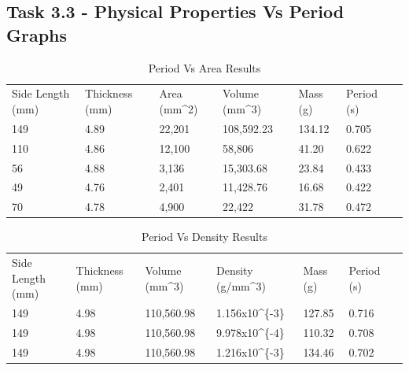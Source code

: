 \documentclass[12pt]{article}
\begin{document}

\pagebreak
\subsection{Task 3.3 - Physical Properties Vs Period Graphs}
\label{Task 3.3 - Physical Properties Vs Period Graphs}

\begin{table}[H]
\centering
\caption{Period Vs Area Results}
\label{Period Vs Area Results}
\begin{tabular}{lllllll}
Side Length (mm) & Thickness (mm) & Area (mm\textasciicircum 2) & Volume (mm\textasciicircum 3) & Mass (g) & Period (s) \\
149              & 4.89           & 22,201                      & 108,592.23                    & 134.12   & 0.705                     \\
110              & 4.86           & 12,100                      & 58,806                        & 41.20    & 0.622                     \\
56               & 4.88           & 3,136                       & 15,303.68                     & 23.84    & 0.433                     \\
49               & 4.76           & 2,401                       & 11,428.76                     & 16.68    & 0.422                     \\
70               & 4.78           & 4,900                       & 22,422                        & 31.78    & 0.472                    
\end{tabular}
\end{table}

\begin{table}[H]
\centering
\caption{Period Vs Density Results}
\label{Period Vs Density Results}
\begin{tabular}{lllllll}
Side Length (mm) & Thickness (mm) & Volume (mm\textasciicircum 3) & Density (g/mm\textasciicircum 3) & Mass (g) & Period (s) \\
149              & 4.98           & 110,560.98                    & 1.156x10\textasciicircum \{-3\}  & 127.85   & 0.716      \\
149              & 4.98           & 110,560.98                    & 9.978x10\textasciicircum \{-4\}  & 110.32   & 0.708      \\
149              & 4.98           & 110,560.98                    & 1.216x10\textasciicircum \{-3\}  & 134.46   & 0.702     
\end{tabular}
\end{table}
\end{document}
